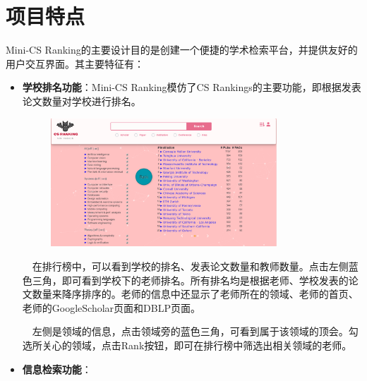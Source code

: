 
\section{项目特点}

Mini-CS Ranking的主要设计目的是创建一个便捷的学术检索平台，并提供友好的用户交互界面。其主要特征有：

\begin{itemize}
\item {\bf 学校排名功能}：Mini-CS Ranking模仿了CS Rankings的主要功能，即根据发表论文数量对学校进行排名。

\begin{figure}[h]
\centering
\includegraphics[width=0.8\textwidth]{asset/ranklist.png}
\end{figure}

$\quad$在排行榜中，可以看到学校的排名、发表论文数量和教师数量。点击左侧蓝色三角，即可看到学校下的老师排名。所有排名均是根据老师、学校发表的论文数量来降序排序的。老师的信息中还显示了老师所在的领域、老师的首页、老师的GoogleScholar页面和DBLP页面。

$\quad$左侧是领域的信息，点击领域旁的蓝色三角，可看到属于该领域的顶会。勾选所关心的领域，点击Rank按钮，即可在排行榜中筛选出相关领域的老师。

\item {\bf 信息检索功能}：


\end{itemize}
